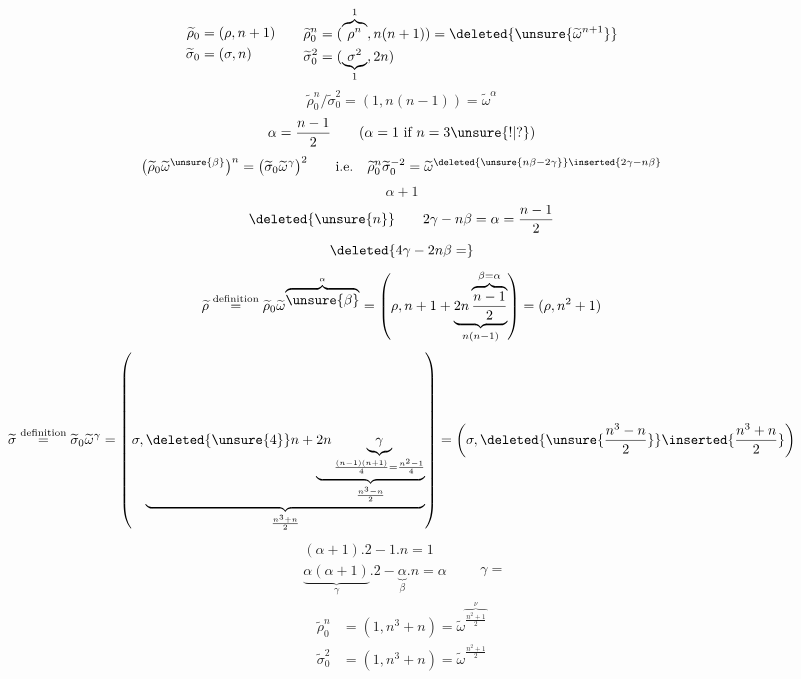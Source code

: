 \[
\begin{aligned}
\widetilde\rho_0&=(\rho,n+1)\\
\widetilde\sigma_0&=(\sigma,n)
\end{aligned}
\qquad
\begin{aligned}
\widetilde\rho_0^n&=(\overbrace{\rho^n}^{1},n(n+1))
 =\deleted{\unsure{\widetilde\omega^{n+1}}}\\
\widetilde\sigma_0^2&=(\underbrace{\sigma^2}_{1},2n)
\end{aligned}
\]
\[
\widetilde\rho_0^n/\widetilde\sigma_0^2
=(1,n(n-1))=\widetilde\omega^{\alpha}
\]
\[
\alpha=\frac{n-1}{2}\qquad
(\alpha=1\text{ if }n=3\unsure{!|?})
\]
\[
\bigl(\widetilde\rho_0\widetilde\omega^{\unsure{\beta}}\bigr)^n
=\bigl(\widetilde\sigma_0\widetilde\omega^{\gamma}\bigr)^2
\qquad\text{i.e.}\quad
\widetilde\rho_0^n\widetilde\sigma_0^{-2}
=\widetilde\omega^{\deleted{\unsure{n\beta-2\gamma}}\inserted{2\gamma-n\beta}}
\]
\[
\alpha+1
\]
\[
\deleted{\unsure{n}}\qquad
2\gamma-n\beta=\alpha=\frac{n-1}{2}
\]
\[
\deleted{4\gamma-2n\beta=}
\]
\[
\widetilde\rho\overset{\text{definition}}=
\widetilde\rho_0\widetilde\omega^{\overbrace{\unsure{\beta}}^{\alpha}}
=\left(\rho,n+1+
\underbrace{2n\overbrace{\frac{n-1}{2}}^{\beta=\alpha}}_{n(n-1)}\right)
=(\rho,n^2+1)
\]
\[
\widetilde\sigma\overset{\text{definition}}=
\widetilde\sigma_0\widetilde\omega^{\gamma}
=\left(\sigma,
\underbrace{
\deleted{\unsure{4}}n+
\underbrace{2n\underbrace{\gamma}_{\frac{(n-1)(n+1)}{4}=\frac{n^2-1}{4}}}
_{\frac{n^3-n}{2}}}_{\frac{n^3+n}{2}}
\right)
=\left(\sigma,\deleted{\unsure{\frac{n^3-n}{2}}}\inserted{\frac{n^3+n}{2}}\right)
\]
\[
\begin{array}{|l}
(\alpha+1).2-1.n=1\\
\underbrace{\alpha(\alpha+1)}_{\gamma}.2-
\underbrace{\alpha}_{\beta}.n=\alpha
\end{array}
\qquad\gamma=
\]
\margin{
\[
\begin{array}{|l}
\widetilde\rho=\widetilde\rho_0\widetilde\omega^{2x}\\
\widetilde\sigma=\widetilde\sigma_0\widetilde\omega^{nx}\\[1em]
x=
\end{array}
\]
}
\[
\begin{aligned}
\widetilde\rho_0^n&=(1,n^3+n)=
\widetilde\omega^{\overbrace{\frac{n^2+1}{2}}^{\nu}}\\
\widetilde\sigma_0^2&=(1,n^3+n)=\widetilde\omega^{\frac{n^2+1}{2}}
\end{aligned}
\]


